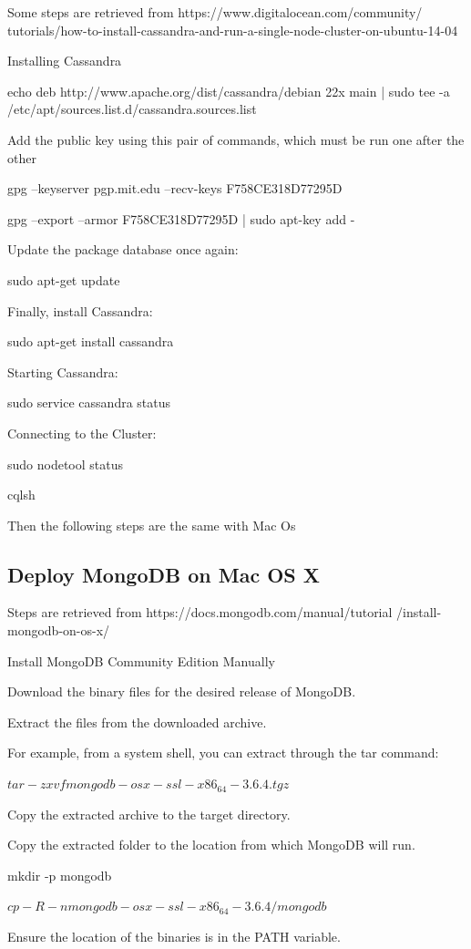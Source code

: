 Some steps are retrieved from https://www.digitalocean.com/community/
tutorials/how-to-install-cassandra-and-run-a-single-node-cluster-on-ubuntu-14-04

Installing Cassandra

echo deb http://www.apache.org/dist/cassandra/debian 22x main | sudo tee -a 
/etc/apt/sources.list.d/cassandra.sources.list

Add the public key using this pair of commands, which must be run one after the other

gpg --keyserver pgp.mit.edu --recv-keys F758CE318D77295D

gpg --export --armor F758CE318D77295D | sudo apt-key add -

Update the package database once again:

	sudo apt-get update

Finally, install Cassandra:

	sudo apt-get install cassandra

Starting Cassandra:

sudo service cassandra status

Connecting to the Cluster:

sudo nodetool status

cqlsh

Then the following steps are the same with Mac Os

\subsection{Deploy MongoDB on Mac OS X}
Steps are retrieved from https://docs.mongodb.com/manual/tutorial
/install-mongodb-on-os-x/

Install MongoDB Community Edition Manually

Download the binary files for the desired release of MongoDB.


Extract the files from the downloaded archive.

For example, from a system shell, you can extract through the tar command:

$tar -zxvf mongodb-osx-ssl-x86_64-3.6.4.tgz$


Copy the extracted archive to the target directory.

Copy the extracted folder to the location from which MongoDB will run.

mkdir -p mongodb

$cp -R -n mongodb-osx-ssl-x86_64-3.6.4/ mongodb$

Ensure the location of the binaries is in the PATH variable.

